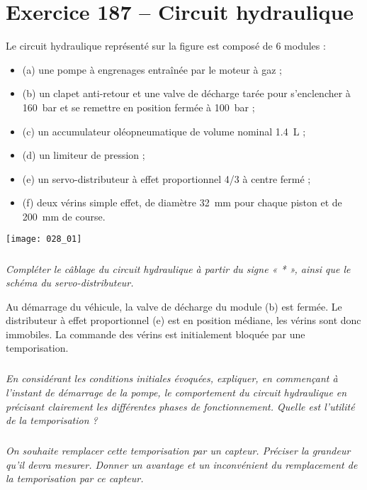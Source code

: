 \section*{Exercice 187 -- Circuit hydraulique}
\setcounter{exo}{0}


Le circuit hydraulique représenté sur la figure est composé de 6 modules :
\begin{itemize}
\item (a)	une pompe à engrenages entraînée par le moteur à gaz ;
\item (b)	un clapet anti-retour et une valve de décharge tarée pour s'enclencher à \SI{160}{bar} et se remettre en position fermée à \SI{100}{bar} ;
\item (c)	un accumulateur oléopneumatique de volume nominal \SI{1,4}{L} ;
\item (d)	un limiteur de pression ;
\item (e)	un servo-distributeur à effet proportionnel 4/3 à centre fermé ;
\item (f)	deux vérins simple effet, de diamètre \SI{32}{mm} pour chaque piston et de \SI{200}{mm} de course.
\end{itemize}

\begin{center}
\texttt{[image: 028\_01]}
\end{center}
\subparagraph{}\textit{Compléter le câblage du circuit hydraulique à partir du signe « * », ainsi que le schéma du servo-distributeur.}
\ifprof
\begin{corrige}
\end{corrige}
\else
\fi

Au démarrage du véhicule, la valve de décharge du module (b) est fermée. Le distributeur à effet proportionnel (e) est en position médiane, les vérins sont donc immobiles. La commande des vérins est initialement bloquée par une temporisation.

\subparagraph{}\textit{En considérant les conditions initiales évoquées, expliquer, en commençant à l'instant de démarrage de la pompe, le comportement du circuit hydraulique en précisant clairement les différentes phases de fonctionnement. Quelle est l'utilité de la temporisation ? }
\ifprof
\begin{corrige}
\end{corrige}
\else
\fi

\subparagraph{}\textit{On souhaite remplacer cette temporisation par un capteur. Préciser la grandeur qu'il devra mesurer. Donner un avantage et un inconvénient du remplacement de la temporisation par ce capteur.}
\ifprof
\begin{corrige}
\end{corrige}
\else
\fi
